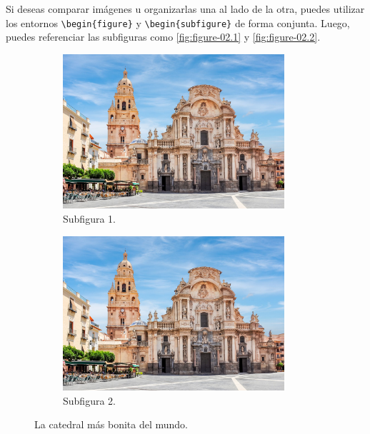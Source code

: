 Si deseas comparar imágenes u organizarlas una al lado de la otra, puedes utilizar los entornos \verb|\begin{figure}| y \verb|\begin{subfigure}| de forma conjunta. Luego, puedes referenciar las subfiguras como \autoref{fig:figure-02.1} y \autoref{fig:figure-02.2}.

\begin{figure}[!htpb]
    \centering
    \begin{subfigure}{0.45\textwidth}
        \centering
        \includegraphics[width=0.9\textwidth]{Figures/catedral.jpg}
        \caption{Subfigura 1.}
        \label{fig:figure-02.1}
    \end{subfigure}
    \hspace{.5cm}
    \begin{subfigure}{0.45\textwidth}
        \centering
        \includegraphics[width=0.9\textwidth]{Figures/catedral.jpg}
        \caption{Subfigura 2.}
        \label{fig:figure-02.2}
    \end{subfigure}
    \caption{La catedral más bonita del mundo.}
    \label{fig:figure-02}
\end{figure}

